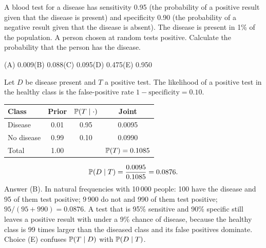 \begin{example}
A blood test for a disease has sensitivity 0.95 (the probability of a positive result given
that the disease is present) and specificity 0.90 (the probability of a negative result given
that the disease is absent). The disease is present in 1\% of the population. A person chosen
at random tests positive. Calculate the probability that the person has the disease.
\par\smallskip\noindent (A) 0.009\qquad (B) 0.088\qquad (C) 0.095\qquad (D) 0.475\qquad (E) 0.950
\end{example}
\begin{solution}
Let $D$ be disease present and $T$ a positive test. The likelihood of a positive test in the
healthy class is the false-positive rate $1 - \text{specificity} = 0.10$.
\begin{center}
\begin{tabular}{@{}lccc@{}}
\toprule
Class & Prior & $\mathbb{P}(T \mid \cdot)$ & Joint \\
\midrule
Disease    & 0.01 & 0.95 & 0.0095 \\
No disease & 0.99 & 0.10 & 0.0990 \\
\midrule
Total      & 1.00 &      & $\mathbb{P}(T) = 0.1085$ \\
\bottomrule
\end{tabular}
\end{center}
\[
\mathbb{P}(D \mid T) = \frac{0.0095}{0.1085} = 0.0876.
\]
Answer (B). In natural frequencies with 10\,000 people: 100 have the disease and 95 of them
test positive; 9\,900 do not and 990 of them test positive; $95/(95 + 990) = 0.0876$. A test
that is 95\% sensitive and 90\% specific still leaves a positive result with under a 9\%
chance of disease, because the healthy class is 99 times larger than the diseased class and
its false positives dominate. Choice (E) confuses $\mathbb{P}(T \mid D)$ with $\mathbb{P}(D \mid T)$.
\end{solution}

